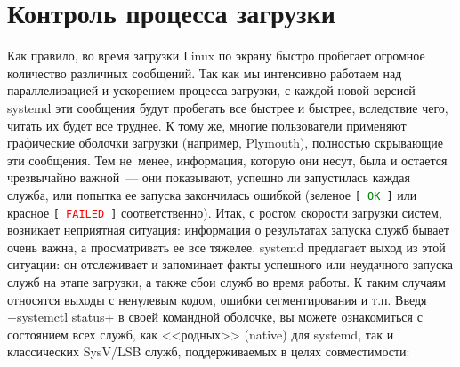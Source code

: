 \documentclass[10pt,oneside,a4paper]{article}
\begin{document}
\section{Контроль процесса загрузки}
Как правило, во время загрузки Linux по экрану быстро пробегает огромное
количество различных сообщений. Так как мы интенсивно работаем над
параллелизацией и ускорением процесса загрузки, с каждой новой версией
systemd эти сообщения будут пробегать все быстрее и быстрее, вследствие чего,
читать их будет все труднее. К тому же, многие пользователи применяют
графические оболочки загрузки (например, Plymouth), полностью скрывающие эти
сообщения. Тем не~менее, информация, которую они несут, была и остается
чрезвычайно важной~--- они показывают, успешно ли запустилась каждая служба, или
попытка ее запуска закончилась ошибкой (зеленое
\texttt{[~\textcolor{green}{OK}~]} или красное
\texttt{[~\textcolor{red}{FAILED}~]} соответственно). Итак, с ростом скорости
загрузки систем, возникает неприятная ситуация: информация о результатах
запуска служб бывает очень важна, а просматривать ее все тяжелее. systemd
предлагает выход из этой ситуации: он отслеживает и запоминает факты успешного
или неудачного запуска служб на этапе загрузки, а также сбои служб во время
работы. К таким случаям относятся выходы с ненулевым кодом, ошибки
сегментирования и т.п. Введя +systemctl status+ в своей командной оболочке, вы
можете ознакомиться с состоянием всех служб, как <<родных>> (native) для
systemd, так и классических SysV/LSB служб, поддерживаемых в целях
совместимости: 
\end{document}
